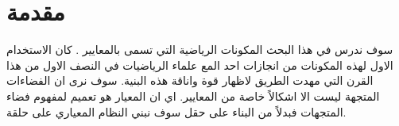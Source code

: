 \chapter*{مقدمة}


\begin{doublespacing}
	سوف ندرس في هذا البحث المكونات الرياضية التي تسمى بالمعايير . كان الاستخدام الاول لهذه المكونات من انجازات احد المع علماء الرياضيات في النصف الاول من هذا القرن \noindent
	  التي مهدت الطريق لاظهار قوة واناقة هذه البنية. سوف نرى ان الفضاءات المتجهة ليست الا اشكالاً خاصة من المعايير. اي ان المعيار هو تعميم لمفهوم فضاء المتجهات فبدلاً من البناء على حقل سوف نبني النظام المعياري على حلقة. 
\end{doublespacing}



